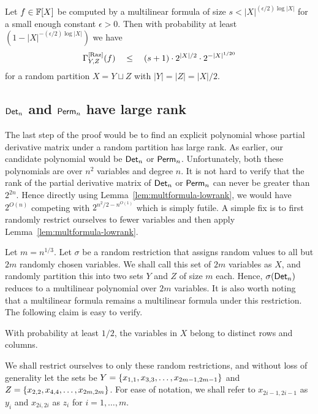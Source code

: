 \begin{lemma}\label{lem:multformula-lowrank}
  Let $f \in \mathbb{F}[X]$ be computed by a multilinear formula of size $s < |X|^{(\epsilon/2) \log |X|}$ for a small enough constant $\epsilon > 0$. Then with probability at least $(1 - |X|^{-(\epsilon/2)\log |X|})$ we have $$\Gamma^{\mathrm{[Raz]}}_{Y,Z}(f) \quad \leq \quad (s+1)\cdot 2^{|X|/2} \cdot 2^{-|X|^{1/20}}$$ for a random partition $X = Y \sqcup Z$ with $|Y| = |Z| = |X|/2$.
\end{lemma}

\subsection{$\mathsf{Det}_n$ and $\mathsf{Perm}_n$ have large rank}

The last step of the proof would be to find an explicit polynomial whose partial derivative matrix under a random partition has large rank. As earlier, our candidate polynomial would be $\mathsf{Det}_n$ or $\mathsf{Perm}_n$. Unfortunately, both these polynomials are over $n^2$ variables and degree $n$. It is not hard to verify that the rank of the partial derivative matrix of $\mathsf{Det}_n$ or $\mathsf{Perm}_n$ can never be greater than $2^{2n}$. Hence directly using Lemma~\ref{lem:multformula-lowrank}, we would have $2^{O(n)}$ competing with $2^{n^2/2 - n^{O(1)}}$ which is simply futile. A simple fix is to first randomly restrict ourselves to fewer variables and then apply Lemma~\ref{lem:multformula-lowrank}. 

Let $m = n^{1/3}$. Let $\sigma$ be a random restriction that assigns random values to all but $2m$ randomly chosen variables. We shall call this set of $2m$ variables as $X$, and randomly partition this into two sets $Y$ and $Z$ of size $m$ each. Hence, $\sigma(\mathsf{Det}_n)$ reduces to a multilinear polynomial over $2m$ variables. It is also worth noting that a multilinear formula remains a multilinear formula under this restriction. The following claim is easy to verify. 

\begin{claim}
With probability at least $1/2$, the variables in $X$ belong to distinct rows and columns. 
\end{claim}

We shall restrict ourselves to only these random restrictions, and without loss of generality let the sets be $Y = \left\{x_{1,1},x_{3,3},\dots,x_{2m-1,2m-1}\right\}$ and $Z = \left\{x_{2,2},x_{4,4},\dots, x_{2m,2m}\right\}$. For ease of notation, we shall refer to $x_{2i-1,2i-1}$ as $y_i$ and $x_{2i,2i}$ as $z_i$ for $i = 1,\dots, m$. 

